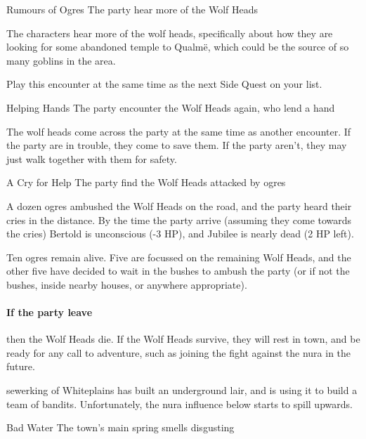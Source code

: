 \begin{multicols}{2}
{\N Rumours of Ogres}%
{The party hear more of the Wolf Heads}%

The characters hear more of the wolf heads, specifically about how they are looking for some abandoned temple to Qualm\"e, which could be the source of so many goblins in the area.

Play this encounter at the same time as the next Side Quest on your list.

{Helping Hands}%
{The party encounter the Wolf Heads again, who lend a hand}%

The wolf heads come across the party at the same time as another encounter.
If the party are in trouble, they come to save them.
If the party aren't, they may just walk together with them for safety.

{\N A Cry for Help}%
{The party find the Wolf Heads attacked by ogres}%

A dozen ogres ambushed the Wolf Heads on the road, and the party heard their cries in the distance.
By the time the party arrive (assuming they come towards the cries) Bertold is unconscious (-3 HP), and Jubilee is nearly dead (2 HP left).

Ten ogres remain alive.
Five are focussed on the remaining Wolf Heads, and the other five have decided to wait in the bushes to ambush the party (or if not the bushes, inside nearby houses, or anywhere appropriate).

\paragraph{If the party leave}
then the Wolf Heads die.
If the Wolf Heads survive, they will rest in \gls{town}, and be ready for any call to adventure, such as joining the fight against the nura in the future.



\stopcontents[sq]

\label{sewerbandits}

\startcontents[sq]

\sqminitoc

\noindent
\Gls{sewerking} of Whiteplains has built an underground lair, and is using it to build a team of bandits.
Unfortunately, the nura influence below starts to spill upwards.

{\N Bad Water}%
{The town's main spring smells disgusting}%


\end{multicols}
